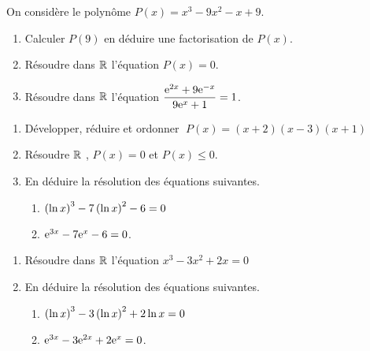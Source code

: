   \begin{exercice}
  On considère le polynôme $ P(x)=x^{3}-9x^{2}-x+9$.
\begin{enumerate}
\item Calculer  $ P(9) $  en déduire une factorisation de  $ P(x)$.
\item Résoudre dans $ \mathbb{R} $  l'équation $ P(x)=0 $.
\item Résoudre dans $ \mathbb{R} $  l'équation $ \dfrac{\mathrm{e}^{2x}+9\mathrm{e}^{-x}}{9\mathrm{e}^{x}+1}=1$.
\end{enumerate}
 \end{exercice}
  
 \begin{exercice}

\begin{enumerate} 
\item Développer, réduire et ordonner  $\; P(x)=(x+2)(x-3)(x+1) $ 
\item Résoudre $ \mathbb{R} $  , $ P(x)=0 $  et  $ P(x)\leq0 $.
\item En déduire  la résolution des équations suivantes.
\begin{enumerate} 
\item $\left(\ln x\right)^{3}-7\left(\ln x\right)^{2}-6=0  $                                                   
 \item $ \mathrm{e}^{3x}-7\mathrm{e}^{x}-6=0 $.

\end{enumerate}
\end{enumerate}

  \end{exercice}
  \begin{exercice}

\begin{enumerate}
\item Résoudre dans $ \mathbb{R} $   l'équation $x^{3}-3x^{2}+2x=0  $ 
\item En déduire  la résolution des équations suivantes.
\begin{enumerate} 
\item $\left(\ln x\right)^{3}-3\left(\ln x\right)^{2}+2\ln x=0  $                                                   
\item $ \mathrm{e}^{3x}-3\mathrm{e}^{2x}+2\mathrm{e}^{x}=0 $.

\end{enumerate}
\end{enumerate}

  \end{exercice}
  

